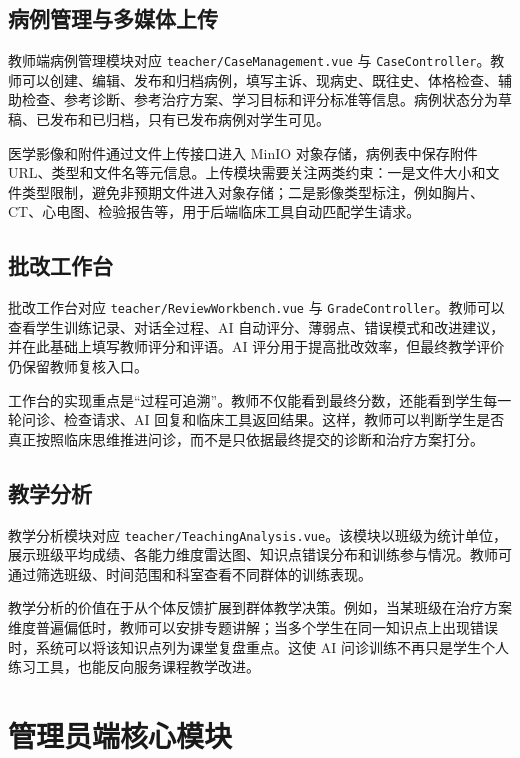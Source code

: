 \subsection{病例管理与多媒体上传}

教师端病例管理模块对应 \texttt{teacher/CaseManagement.vue} 与 \texttt{CaseController}。教师可以创建、编辑、发布和归档病例，填写主诉、现病史、既往史、体格检查、辅助检查、参考诊断、参考治疗方案、学习目标和评分标准等信息。病例状态分为草稿、已发布和已归档，只有已发布病例对学生可见。

医学影像和附件通过文件上传接口进入 MinIO 对象存储，病例表中保存附件 URL、类型和文件名等元信息。上传模块需要关注两类约束：一是文件大小和文件类型限制，避免非预期文件进入对象存储；二是影像类型标注，例如胸片、CT、心电图、检验报告等，用于后端临床工具自动匹配学生请求。

\subsection{批改工作台}

批改工作台对应 \texttt{teacher/ReviewWorkbench.vue} 与 \texttt{GradeController}。教师可以查看学生训练记录、对话全过程、AI 自动评分、薄弱点、错误模式和改进建议，并在此基础上填写教师评分和评语。AI 评分用于提高批改效率，但最终教学评价仍保留教师复核入口。

工作台的实现重点是“过程可追溯”。教师不仅能看到最终分数，还能看到学生每一轮问诊、检查请求、AI 回复和临床工具返回结果。这样，教师可以判断学生是否真正按照临床思维推进问诊，而不是只依据最终提交的诊断和治疗方案打分。

\subsection{教学分析}

教学分析模块对应 \texttt{teacher/TeachingAnalysis.vue}。该模块以班级为统计单位，展示班级平均成绩、各能力维度雷达图、知识点错误分布和训练参与情况。教师可通过筛选班级、时间范围和科室查看不同群体的训练表现。

教学分析的价值在于从个体反馈扩展到群体教学决策。例如，当某班级在治疗方案维度普遍偏低时，教师可以安排专题讲解；当多个学生在同一知识点上出现错误时，系统可以将该知识点列为课堂复盘重点。这使 AI 问诊训练不再只是学生个人练习工具，也能反向服务课程教学改进。

\section{管理员端核心模块}

